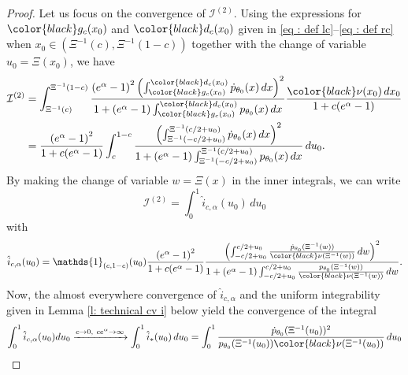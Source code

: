 \documentclass[a4paper, 11pt]{article}
\theoremstyle{definition}
\newcommand{\modar}{\color{black}}
\newcommand{\indi}[1]{\mathds{1}_{#1}}
\begin{document}
{\begin{proof}
Let us focus on the convergence of $\mathcal{I}^{(2)}$. Using the expressions for ${\modar g_c}(x_0)$ and ${\modar d_c}(x_0)$ given in
\eqref{eq : def lc}--\eqref{eq : def rc} when $x_0 \in (\Xi^{-1}(c),\Xi^{-1}(1-c))$ together with the change of variable $u_0=\Xi(x_0)$, we have
\begin{align*}
\mathcal{I}^{(2)}
&=		\int_{\Xi^{-1}(c)}^{\Xi^{-1}(1-c)} 
\frac{\left(e^\alpha-1\right)^2  \left( \int_{{\modar g_c}(x_0)}^{{\modar d_c}(x_0)}\dot{p}_{\theta_0}(x)\,dx\right)^2}
{1+\left(e^\alpha-1\right) \int_{{\modar g_c}(x_0)}^{{\modar d_c}(x_0)} p_{\theta_0}(x)\,dx}
	\frac{{\modar\nu}(x_0)\,dx_0}{1+c(e^\alpha-1)} 
\\
&=\frac{\left(e^\alpha-1\right)^2}{1+c(e^\alpha-1)}\int_c^{1-c}  
\frac{ \left(\int_{\Xi^{-1}(-c/2+u_0)}^{\Xi^{-1}(c/2+u_0)} \dot{p}_{\theta_0}(x)\,dx \right)^2 
}{1 + (e^\alpha-1) \int_{\Xi^{-1}(-c/2+u_0)}^{\Xi^{-1}(c/2+u_0)} 
p_{\theta_0}(x)\,dx   
}
\,du_0 .
\end{align*}
By making the change of variable $w=\Xi(x)$ in the inner integrals, we can write
\begin{equation*}
	\mathcal{I}^{(2)}
=\int_0^1 \hat{i}_{c,\alpha}(u_0) \,du_0
\end{equation*}
with 
\begin{equation} \label{eq : def hat i c alpha}
	\hat{i}_{c,\alpha}(u_0)= \indi{(c,1-c)}(u_0) \frac{\left(e^\alpha-1\right)^2}{1+c(e^\alpha-1)}
	\frac{ \left(\int_{-c/2+u_0}^{c/2+u_0} \frac{\dot{p}_{\theta_0}(\Xi^{-1}(w))}{{\modar \nu}(\Xi^{-1}(w))} \,dw \right)^2 
	}{1 + (e^\alpha-1) \int_{-c/2+u_0}^{c/2+u_0} \frac{p_{\theta_0}(\Xi^{-1}(w))}{{\modar \nu}(\Xi^{-1}(w))} \,dw  }   .
\end{equation} 
Now, the almost everywhere convergence of $\hat{i}_{c,\alpha}$ and the uniform integrability given in Lemma \ref{l: technical cv i} below 
yield the convergence of the integral 
\begin{equation*}
\int_0^1 \hat{i}_{c,\alpha}(u_0) du_0 \xrightarrow{c\to0,~ce^\alpha\to\infty} \int_0^1 \hat{i}_*(u_0) \,du_0
=\int_0^1
 \frac{\dot{p}_{\theta_0}(\Xi^{-1}(u_0))^2}{p_{\theta_0}(\Xi^{-1}(u_0)){\modar \nu}(\Xi^{-1}(u_0))} \,du_0

\end{equation*}
\end{proof}}
\end{document}

